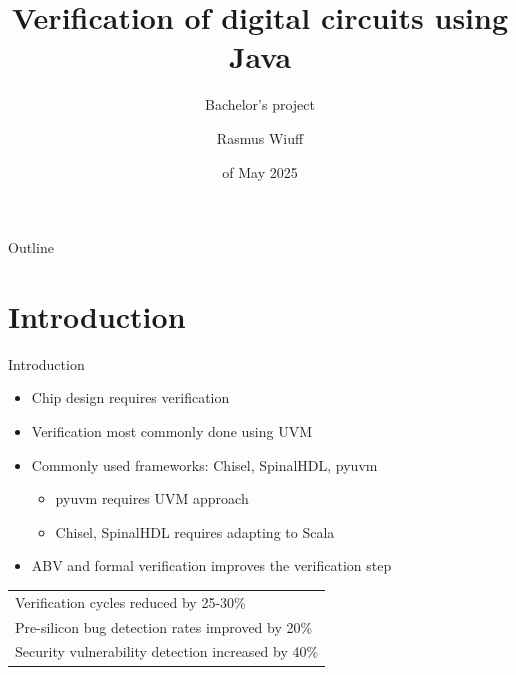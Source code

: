 \documentclass[aspectratio=169, handout]{beamer}
\title{Verification of digital circuits using Java}
\subtitle{Bachelor's project}
\author{Rasmus Wiuff}
\institute{DTU}
\date{\nth{19} of May 2025}
\begin{document}
\frame[plain]{\titlepage}

\begin{frame}{Outline}
    \tableofcontents
\end{frame}

\section{Introduction}
\begin{frame}{Introduction}
    \begin{itemize}
        \item Chip design requires verification
        \item Verification most commonly done using UVM
        \item Commonly used frameworks: Chisel, SpinalHDL, pyuvm
        \begin{itemize}
            \item pyuvm requires UVM approach
            \item Chisel, SpinalHDL requires adapting to Scala
        \end{itemize}
        \item ABV and formal verification improves the verification step
    \end{itemize}
    \begin{center}
        \begin{tabular}{l}
            \toprule
            Verification cycles reduced by 25-30\%             \\
            Pre-silicon bug detection rates improved by 20\%   \\
            Security vulnerability detection increased by 40\% \\
            \bottomrule
        \end{tabular}
    \end{center}
\end{frame}
\end{document}

